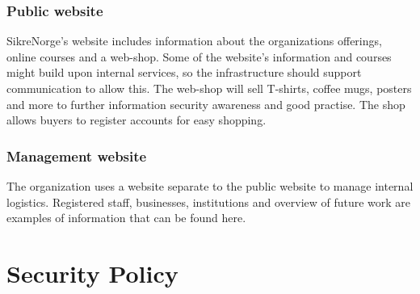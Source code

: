 \subsubsection{Public website}

SikreNorge's website includes information about the organizations offerings, online courses and a web-shop. Some of the website's information and courses might build upon internal services, so the infrastructure should support communication to allow this. The web-shop will sell T-shirts, coffee mugs, posters and more to further information security awareness and good practise. The shop allows buyers to register accounts for easy shopping.

\subsubsection{Management website}

The organization uses a website separate to the public website to manage internal logistics. Registered staff, businesses, institutions and overview of future work are examples of information that can be found here.


\section{Security Policy}


